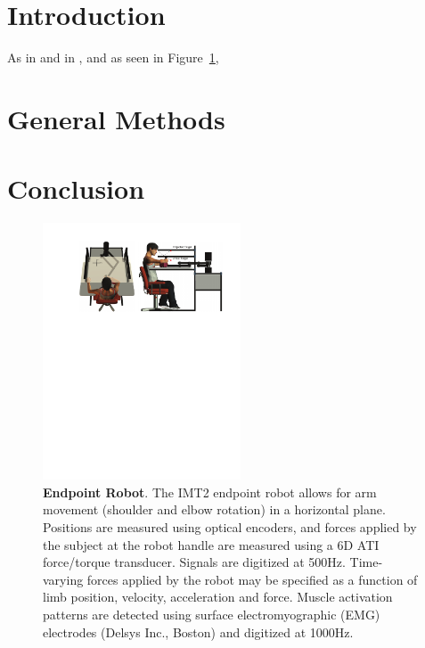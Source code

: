 \documentclass[11pt,letterpaper,twocolumn]{article}
\begin{document}
  
\section*{Introduction}

As in \cite{mattar2005motor} and in \cite{hodgkin1952propagation},
and as seen in Figure~\ref{fig:robot}, \lipsum[1-7]

\section*{General Methods}

\lipsum[1-6]

\section*{Conclusion}

\lipsum[1]

\newpage
\onecolumn




\newpage
\clearpage
\begin{figure}[H]
	\centering
        \includegraphics[height=3in]{robot_imt.pdf}
        \caption{\textbf{Endpoint Robot}. The IMT2 endpoint robot
          allows for arm movement (shoulder and elbow rotation) in a
          horizontal plane. Positions are measured using optical
          encoders, and forces applied by the subject at the robot
          handle are measured using a 6D ATI force/torque
          transducer. Signals are digitized at 500Hz. Time-varying
          forces applied by the robot may be specified as a function
          of limb position, velocity, acceleration and force. Muscle
          activation patterns are detected using surface
          electromyographic (EMG) electrodes (Delsys Inc., Boston) and
          digitized at 1000Hz.}
 \label{fig:robot}
\end{figure}


\end{document}

